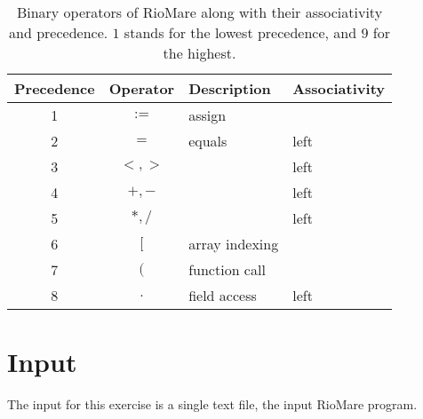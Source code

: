 \documentclass{article}
\begin{document}
\begin{table}[h]
\centering
\begin{tabular}{ |c|c|l|l| }
\hline
Precedence & Operator & Description & Associativity \\
\hline
\hline
1          & $:=$            & assign         &       \\
\hline
2          & $=$             & equals         & left  \\
\hline
3          & $<,>$           &                & left  \\
\hline
4          & $+,-$           &                & left  \\
\hline
5          & $*,/$           &                & left  \\
\hline
6          & $[$             & array indexing &       \\
\hline
7          & $($             & function call  &       \\
\hline
8          & $.$     & field access   & left          \\
\hline
\end{tabular}
\caption{
Binary operators of RioMare along with their associativity and precedence.
$1$ stands for the lowest precedence, and $9$ for the highest.
\label{Table_Binary_Operators_Of_RioMare}}
\end{table}

\section{Input}
The input for this exercise is a single text file, the input RioMare program.
\end{document}
